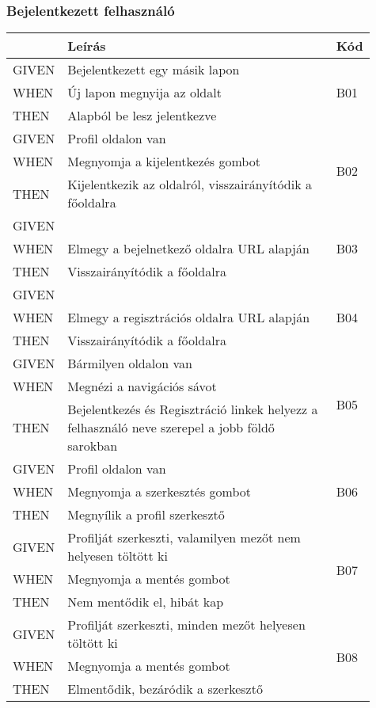 \subsubsection{Bejelentkezett felhasználó}

\begin{table}[H]
	\centering
	\begin{tabular}{|m{0.1\linewidth}|m{0.75\linewidth}|m{0.06\linewidth}|}
		\hline
		& \textbf{Leírás} & \textbf{Kód} \\
		\hline
		GIVEN & Bejelentkezett egy másik lapon & \multirow{3}{*}{B01} \\ \cline{1-2}
		WHEN  & Új lapon megnyija az oldalt & \\ \cline{1-2}
		THEN  & Alapból be lesz jelentkezve & \\ 
		\hline
		GIVEN & Profil oldalon van & \multirow{3}{*}{B02} \\ \cline{1-2}
		WHEN  & Megnyomja a kijelentkezés gombot & \\ \cline{1-2}
		THEN  & Kijelentkezik az oldalról, visszairányítódik a főoldalra & \\ 
		\hline
		GIVEN &  & \multirow{3}{*}{B03} \\ \cline{1-2}
		WHEN  & Elmegy a bejelnetkező oldalra URL alapján & \\ \cline{1-2}
		THEN  & Visszairányítódik a főoldalra & \\ 
		\hline
		GIVEN &  & \multirow{3}{*}{B04} \\ \cline{1-2}
		WHEN  & Elmegy a regisztrációs oldalra URL alapján & \\ \cline{1-2}
		THEN  & Visszairányítódik a főoldalra & \\ 
		\hline
		GIVEN & Bármilyen oldalon van & \multirow{3}{*}{B05} \\ \cline{1-2}
		WHEN  & Megnézi a navigációs sávot & \\ \cline{1-2}
		THEN  & Bejelentkezés és Regisztráció linkek helyezz a felhasználó neve szerepel a jobb földő sarokban & \\ 
		\hline
		GIVEN & Profil oldalon van & \multirow{3}{*}{B06} \\ \cline{1-2}
		WHEN  & Megnyomja a szerkesztés gombot & \\ \cline{1-2}
		THEN  & Megnyílik a profil szerkesztő & \\ 
		\hline
		GIVEN & Profilját szerkeszti, valamilyen mezőt nem helyesen töltött ki & \multirow{3}{*}{B07} \\ \cline{1-2}
		WHEN  & Megnyomja a mentés gombot & \\ \cline{1-2}
		THEN  & Nem mentődik el, hibát kap & \\ 
		\hline
		GIVEN & Profilját szerkeszti, minden mezőt helyesen töltött ki & \multirow{3}{*}{B08} \\ \cline{1-2}
		WHEN  & Megnyomja a mentés gombot & \\ \cline{1-2}
		THEN  & Elmentődik, bezáródik a szerkesztő & \\ 
		\hline
	\end{tabular}
\end{table}

